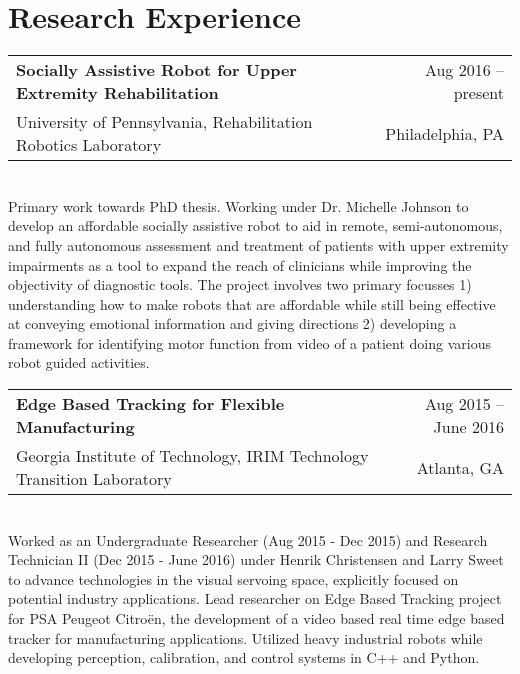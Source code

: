 \documentclass[10pt, letter]{article}
\makeatletter
\newlength{\currentparskip}
\newlength{\cvindent}
\newenvironment{cvsection}[1]{
    \section*{#1}   
}{
}
\newcommand{\cvitem}[6]{
    \setlength{\currentparskip}{\parskip}%
    \strut\hfill\begin{minipage}{\dimexpr\textwidth-\cvindent}
    \setlength{\parskip}{\currentparskip}%
    \begin{tabular*}{\linewidth}{@{}l@{\extracolsep{\fill}}r@{}}
        \textbf{#1} & #4 -- #5\\
        #2 & #3
    \end{tabular*}\\[.05cm]
    #6
    \end{minipage}
    \vspace{.3cm}
}
\makeatother
\begin{document}
\begin{cvsection}{Research Experience}
    \cvitem{Socially Assistive Robot for Upper Extremity Rehabilitation}{University of Pennsylvania, Rehabilitation Robotics Laboratory}{Philadelphia, PA }{Aug 2016}{present}{Primary work towards PhD thesis. Working under Dr. Michelle Johnson to develop an affordable socially assistive robot to aid in remote, semi-autonomous, and fully autonomous assessment and treatment of patients with upper extremity impairments as a tool to expand the reach of clinicians while improving the objectivity of diagnostic tools. The project involves two primary focusses 1) understanding how to make robots that are affordable while still being effective at conveying emotional information and giving directions 2) developing a framework for identifying motor function from video of a patient doing various robot guided activities.}

    \cvitem{Edge Based Tracking for Flexible Manufacturing}{Georgia Institute of Technology, IRIM Technology Transition Laboratory}{Atlanta, GA}{Aug 2015}{June 2016}{Worked as an Undergraduate Researcher (Aug 2015 - Dec 2015) and Research Technician II (Dec 2015 - June 2016) under Henrik Christensen and Larry Sweet to advance technologies in the visual servoing space, explicitly focused on potential industry applications. Lead researcher on Edge Based Tracking project for PSA Peugeot Citroën, the development of a video based real time edge based tracker for manufacturing applications. Utilized heavy industrial robots while developing perception, calibration, and control systems in C++ and Python. }
\end{cvsection}
\end{document}
